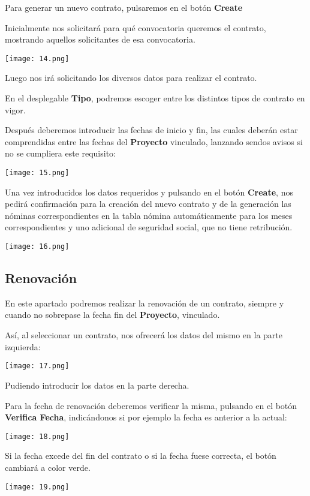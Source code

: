 Para generar un nuevo contrato, pulsaremos en el botón \textbf{Create}

Inicialmente nos solicitará para qué convocatoria queremos el contrato, mostrando aquellos solicitantes de esa convocatoria.

\texttt{[image: 14.png]}

Luego nos irá solicitando los diversos datos para realizar el contrato.

En el desplegable \textbf{Tipo}, podremos escoger entre los distintos tipos de contrato en vigor.

Después deberemos introducir las fechas de inicio y fin, las cuales
deberán estar comprendidas entre las fechas del \textbf{Proyecto}
vinculado, lanzando sendos avisos si no se cumpliera este requisito:

\texttt{[image: 15.png]}

Una vez introducidos los datos requeridos y pulsando en el botón
\textbf{Create}, nos pedirá confirmación para la creación del nuevo
contrato y de la generación las nóminas correspondientes en la tabla nómina automáticamente para los meses correspondientes y uno adicional de seguridad social, que no tiene retribución.

\texttt{[image: 16.png]}

\subsection{Renovación}\label{renovaciuxf3n}

En este apartado podremos realizar la renovación de un contrato, siempre y cuando no sobrepase la fecha fin del \textbf{Proyecto}, vinculado.

Así, al seleccionar un contrato, nos ofrecerá los datos del mismo en la parte izquierda:

\texttt{[image: 17.png]}

Pudiendo introducir los datos en la parte derecha.

Para la fecha de renovación deberemos verificar la misma, pulsando en el botón \textbf{Verifica Fecha}, indicándonos si por ejemplo la fecha es anterior a la actual:

\texttt{[image: 18.png]}

Si la fecha excede del fin del contrato o si la fecha fuese correcta, el botón cambiará a color verde.

\texttt{[image: 19.png]}

